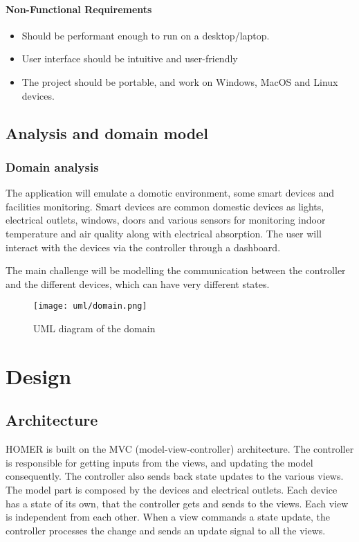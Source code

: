 \documentclass[a4paper,12pt]{report}
\begin{document}
\subsubsection{Non-Functional Requirements}

\begin{itemize}
	\item Should be performant enough to run on a desktop/laptop.
	\item User interface should be intuitive and user-friendly
	\item The project should be portable, and work on Windows, MacOS and Linux devices.
\end{itemize}

\section{Analysis and domain model}
\subsection{Domain analysis}

The application will emulate a domotic environment, some smart devices and facilities monitoring.
Smart devices are common domestic devices as lights, electrical outlets, windows, doors and various sensors 
for monitoring indoor temperature and air quality along with electrical absorption.
The user will interact with the devices via the controller through a dashboard.

The main challenge will be modelling the communication between the controller 
and the different devices, which can have very different states.

\begin{figure}[H]
\centering{}
\texttt{[image: uml/domain.png]}
\caption{UML diagram of the domain}
\label{uml:domain}
\end{figure}

\chapter{Design}
\section{Architecture}

HOMER is built on the MVC (model-view-controller) architecture. 
The controller is responsible for getting inputs from the views, and updating the model consequently.
The controller also sends back state updates to the various views.
The model part is composed by the devices and electrical outlets. Each device has a state of its own, that
the controller gets and sends to the views. 
Each view is independent from each other.
When a view commands a state update, the controller processes the change and sends an update signal to all the views.
\end{document}
